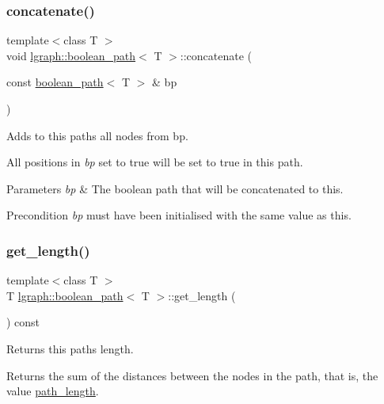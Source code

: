 \subsubsection{\texorpdfstring{concatenate()}{concatenate()}}
{\footnotesize\ttfamily template$<$class T $>$ \\
void \hyperlink{classlgraph_1_1boolean__path}{lgraph\+::boolean\+\_\+path}$<$ T $>$\+::concatenate (\begin{DoxyParamCaption}\item[{const \hyperlink{classlgraph_1_1boolean__path}{boolean\+\_\+path}$<$ T $>$ \&}]{bp }\end{DoxyParamCaption})}



Adds to this paths all nodes from bp. 

All positions in {\itshape bp} set to true will be set to true in this path.


\begin{DoxyParams}{Parameters}
{\em bp} & The boolean path that will be concatenated to this. \\
\hline
\end{DoxyParams}
\begin{DoxyPrecond}{Precondition}
{\itshape bp} must have been initialised with the same value as this. 
\end{DoxyPrecond}
\mbox{\label{classlgraph_1_1boolean__path_aaf0aa82860b5c5b29e6f5533c2599463}} 
\subsubsection{\texorpdfstring{get\+\_\+length()}{get\_length()}}
{\footnotesize\ttfamily template$<$class T $>$ \\
T \hyperlink{classlgraph_1_1boolean__path}{lgraph\+::boolean\+\_\+path}$<$ T $>$\+::get\+\_\+length (\begin{DoxyParamCaption}{ }\end{DoxyParamCaption}) const}



Returns this path\textquotesingle{}s length. 

Returns the sum of the distances between the nodes in the path, that is, the value \hyperlink{classlgraph_1_1boolean__path_ab298ac156fd7d73e21769fd30b2c5ad1}{path\+\_\+length}. \mbox{\label{classlgraph_1_1boolean__path_a3e8fde070fbf86b3e9c6d6d4bc3b4a07}} 
